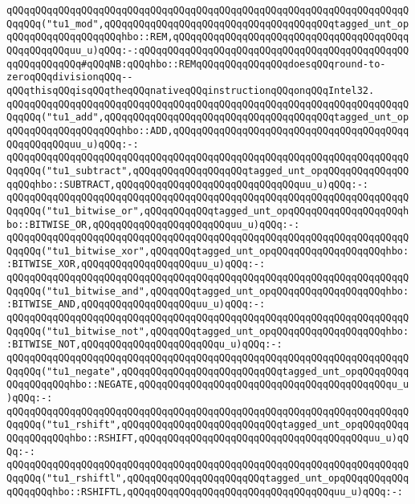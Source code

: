 \verb|qQQqqQQqqQQqqQQqqQQqqQQqqQQqqQQqqQQqqQQqqQQqqQQqqQQqqQQqqQQqqQQqqQQqqQQqqQQq("tu1_mod",qQQqqQQqqQQqqQQqqQQqqQQqqQQqqQQqqQQqqQQqtagged_unt_opqQQqqQQqqQQqqQQqqQQqhbo::REM,qQQqqQQqqQQqqQQqqQQqqQQqqQQqqQQqqQQqqQQqqQQqqQQqqQQquu_u)qQQq:-:qQQqqQQqqQQqqQQqqQQqqQQqqQQqqQQqqQQqqQQqqQQqqQQqqQQqqQQqqQQq#qQQqNB:qQQqhbo::REMqQQqqQQqqQQqqQQqdoesqQQqround-to-zeroqQQqdivisionqQQq--qQQqthisqQQqisqQQqtheqQQqnativeqQQqinstructionqQQqonqQQqIntel32.|\newline
\verb|qQQqqQQqqQQqqQQqqQQqqQQqqQQqqQQqqQQqqQQqqQQqqQQqqQQqqQQqqQQqqQQqqQQqqQQqqQQq("tu1_add",qQQqqQQqqQQqqQQqqQQqqQQqqQQqqQQqqQQqqQQqtagged_unt_opqQQqqQQqqQQqqQQqqQQqhbo::ADD,qQQqqQQqqQQqqQQqqQQqqQQqqQQqqQQqqQQqqQQqqQQqqQQqqQQquu_u)qQQq:-:|\newline
\verb|qQQqqQQqqQQqqQQqqQQqqQQqqQQqqQQqqQQqqQQqqQQqqQQqqQQqqQQqqQQqqQQqqQQqqQQqqQQq("tu1_subtract",qQQqqQQqqQQqqQQqqQQqtagged_unt_opqQQqqQQqqQQqqQQqqQQqhbo::SUBTRACT,qQQqqQQqqQQqqQQqqQQqqQQqqQQqqQQquu_u)qQQq:-:|\newline
\verb|qQQqqQQqqQQqqQQqqQQqqQQqqQQqqQQqqQQqqQQqqQQqqQQqqQQqqQQqqQQqqQQqqQQqqQQqqQQq("tu1_bitwise_or",qQQqqQQqqQQqtagged_unt_opqQQqqQQqqQQqqQQqqQQqhbo::BITWISE_OR,qQQqqQQqqQQqqQQqqQQqqQQquu_u)qQQq:-:|\newline
\verb|qQQqqQQqqQQqqQQqqQQqqQQqqQQqqQQqqQQqqQQqqQQqqQQqqQQqqQQqqQQqqQQqqQQqqQQqqQQq("tu1_bitwise_xor",qQQqqQQqtagged_unt_opqQQqqQQqqQQqqQQqqQQqhbo::BITWISE_XOR,qQQqqQQqqQQqqQQqqQQquu_u)qQQq:-:|\newline
\verb|qQQqqQQqqQQqqQQqqQQqqQQqqQQqqQQqqQQqqQQqqQQqqQQqqQQqqQQqqQQqqQQqqQQqqQQqqQQq("tu1_bitwise_and",qQQqqQQqtagged_unt_opqQQqqQQqqQQqqQQqqQQqhbo::BITWISE_AND,qQQqqQQqqQQqqQQqqQQquu_u)qQQq:-:|\newline
\verb|qQQqqQQqqQQqqQQqqQQqqQQqqQQqqQQqqQQqqQQqqQQqqQQqqQQqqQQqqQQqqQQqqQQqqQQqqQQq("tu1_bitwise_not",qQQqqQQqtagged_unt_opqQQqqQQqqQQqqQQqqQQqhbo::BITWISE_NOT,qQQqqQQqqQQqqQQqqQQqqQQqu_u)qQQq:-:|\newline
\verb|qQQqqQQqqQQqqQQqqQQqqQQqqQQqqQQqqQQqqQQqqQQqqQQqqQQqqQQqqQQqqQQqqQQqqQQqqQQq("tu1_negate",qQQqqQQqqQQqqQQqqQQqqQQqqQQqtagged_unt_opqQQqqQQqqQQqqQQqqQQqhbo::NEGATE,qQQqqQQqqQQqqQQqqQQqqQQqqQQqqQQqqQQqqQQqqQQqu_u)qQQq:-:|\newline
\verb|qQQqqQQqqQQqqQQqqQQqqQQqqQQqqQQqqQQqqQQqqQQqqQQqqQQqqQQqqQQqqQQqqQQqqQQqqQQq("tu1_rshift",qQQqqQQqqQQqqQQqqQQqqQQqqQQqtagged_unt_opqQQqqQQqqQQqqQQqqQQqhbo::RSHIFT,qQQqqQQqqQQqqQQqqQQqqQQqqQQqqQQqqQQqqQQquu_u)qQQq:-:|\newline
\verb|qQQqqQQqqQQqqQQqqQQqqQQqqQQqqQQqqQQqqQQqqQQqqQQqqQQqqQQqqQQqqQQqqQQqqQQqqQQq("tu1_rshiftl",qQQqqQQqqQQqqQQqqQQqqQQqtagged_unt_opqQQqqQQqqQQqqQQqqQQqhbo::RSHIFTL,qQQqqQQqqQQqqQQqqQQqqQQqqQQqqQQqqQQquu_u)qQQq:-:|\newline
